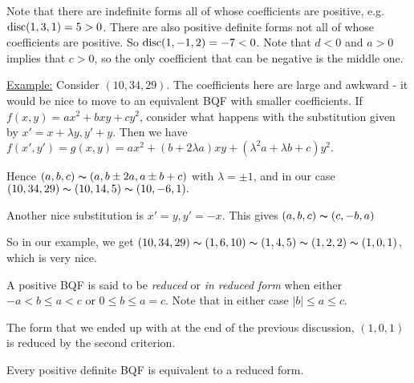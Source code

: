 \documentclass[10pt,a4paper]{article}
\begin{document}
Note that there are indefinite forms all of whose coefficients are positive, e.g. $\operatorname{disc}(1,3,1) = 5 > 0$. There are also positive definite forms not all of whose coefficients are positive. So $\operatorname{disc}(1,-1,2) = -7 < 0$. Note that $d < 0$ and $a>0$ implies that $c>0$, so the only coefficient that can be negative is the middle one.

\underline{Example:} Consider $(10,34,29)$. The coefficients here are large and awkward - it would be nice to move to an equivalent BQF with smaller coefficients. If $f(x,y) = ax^2 + bxy + cy^2$, consider what happens with the substitution given by $x' = x+ \lambda y, y' + y$. Then we have $f(x', y') = g(x, y) = ax^2 + (b+2\lambda a) xy + (\lambda^2a + \lambda b +c)y^2.$

Hence $(a,b,c) \thicksim (a, b\pm 2a, a\pm b + c)$ with $\lambda = \pm 1$, and in our case $(10, 34, 29) \thicksim (10, 14, 5) \thicksim (10,-6,1).$

Another nice substitution is $x' = y, y' = -x$. This gives $(a,b,c) \thicksim (c, -b, a)$

So in our example, we get $(10, 34, 29) \thicksim (1, 6, 10) \thicksim (1, 4, 5) \thicksim (1, 2, 2) \thicksim (1, 0, 1)$, which is very nice. 

A positive BQF is said to be \emph{reduced} or \emph{in reduced form} when either $-a < b \leq a < c$ or $0 \leq b \leq a = c$. Note that in either case $|b| \leq a \leq c$.

The form that we ended up with at the end of the previous discussion, $(1,0,1)$ is reduced by the second criterion.

\begin{proposition}
Every positive definite BQF is equivalent to a reduced form.
\end{proposition}
\end{document}
